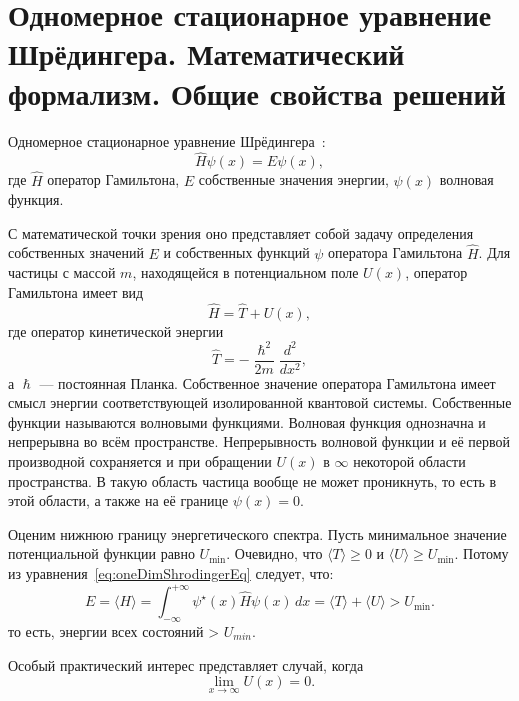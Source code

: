 \documentclass[a4paper,12pt]{article}
\begin{document}
\newpage
\section{Одномерное стационарное уравнение Шрёдингера. Математический формализм. Общие свойства решений}\label{sec:-}
Одномерное стационарное уравнение Шрёдингера~\cite{tim_shrod}:
\begin{equation}
    \hat{H}\psi(x) = E\psi(x),
    \label{eq:oneDimShrodingerEq}
\end{equation}
где $\hat{H}$ \textendash{} оператор Гамильтона, $E$ \textendash{} собственные значения энергии, $\psi(x)$ \textendash{} волновая функция.

С математической точки зрения оно представляет собой задачу определения собственных значений $E$ и собственных функций $\psi$ оператора Гамильтона $\hat{H}$.
Для частицы с массой $m$, находящейся в потенциальном поле $U(x)$, оператор Гамильтона имеет вид
\begin{equation}
    \hat{H} = \hat{T}+ U(x),
    \label{eq:equation}
\end{equation}
где оператор кинетической энергии
\begin{equation}
    \hat{T} =-\frac{\hslash^2}{2m}\frac{d^2}{dx^2},
    \label{eq:equation2}
\end{equation}
а $\hslash$ --- постоянная Планка.
Собственное значение оператора Гамильтона имеет смысл энергии соответствующей изолированной квантовой системы.
Собственные функции называются волновыми функциями.
Волновая функция однозначна и непрерывна во всём пространстве.
Непрерывность волновой функции и её первой производной сохраняется и при обращении $U(x)$ в $\infty$ некоторой области пространства.
В такую область частица вообще не может проникнуть, то есть в этой области, а также на её границе $\psi(x)=0$.

Оценим нижнюю границу энергетического спектра.
Пусть минимальное значение потенциальной функции равно $U_{\min}$.
Очевидно, что $\langle T \rangle \geq 0$ и $\langle U \rangle \geq U_{\min}$.
Потому из уравнения~\eqref{eq:oneDimShrodingerEq} следует, что:
\begin{equation}
    E =\langle H\rangle = \int_{-\infty}^{+\infty} \psi^\star(x)\hat{H}\psi(x) \,dx =\langle T\rangle +\langle U\rangle > U_{\min}.
\label{eq:e_h_integral}
\end{equation}
то есть, энергии всех состояний > $U_{min}$.

Особый практический интерес представляет случай, когда
\begin{equation}
    \lim_{x\to\infty} U(x) = 0.
\label{eq:limit_pot_inf}
\end{equation}
\end{document}
